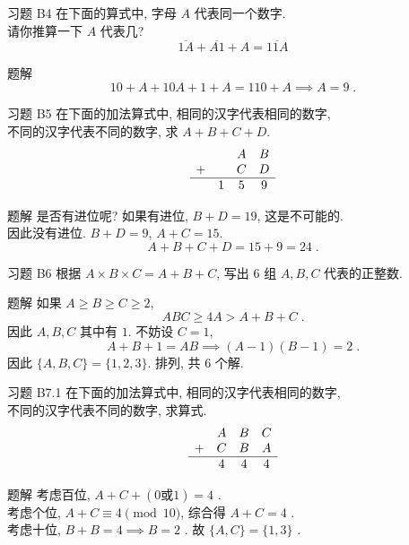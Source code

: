 \documentclass[content.tex]{subfiles}
\begin{document}
\begin{frame}{习题 B4}
在下面的算式中, 字母 $A$ 代表同一个数字. \\
请你推算一下 $A$ 代表几?
$$\overline{1A} + \overline{A1} + A = \overline{11A}$$
\begin{exampleblock}{题解}
$$10+A+10A+1+A=110+A\implies A = 9\;.$$
\end{exampleblock}
\end{frame}

\begin{frame}{习题 B5}
在下面的加法算式中, 相同的汉字代表相同的数字, \\ 不同的汉字代表不同的数字, 求 $A+B+C+D$.
$$
\begin{matrix}
  &   & A & B \\
+ &   & C & D \\
\hline
  & 1 & 5 & 9
\end{matrix}
$$
\begin{exampleblock}{题解}
是否有进位呢? 如果有进位, $B + D = 19$, 这是不可能的. \\
因此没有进位. $B + D = 9$, $A + C = 15$. 
$$A+B+C+D=15+9=24\;.$$
\end{exampleblock}
\end{frame}

\begin{frame}{习题 B6}
根据 $A\times B\times C = A+B+C$, 写出 6 组 $A, B, C$ 代表的正整数.
\begin{exampleblock}{题解}
如果 $A\ge B\ge C\ge 2$, 
$$ABC\ge 4A > A + B + C\;.$$
因此 $A,B,C$ 其中有 $1$. 不妨设 $C=1$, 
$$A+B+1=AB\implies (A-1)(B-1) = 2\;.$$
因此 $\{A, B, C\} = \{1, 2, 3\}$. 排列, 共 6 个解.
\end{exampleblock}
\end{frame}

\begin{frame}{习题 B7.1}
在下面的加法算式中, 相同的汉字代表相同的数字, \\ 不同的汉字代表不同的数字, 求算式.
$$
\begin{matrix}
  & A & B & C \\
+ & C & B & A \\
\hline
  & 4 & 4 & 4
\end{matrix}
$$
\begin{exampleblock}{题解}
考虑百位, $A+C+(0\text{或}1)=4$ . \\
考虑个位, $A+C\equiv 4 \pmod{10}$, 综合得 $A+C=4$ . \\
考虑十位, $B+B=4\implies B=2$ . 故 $\{A, C\}=\{1,3\}$ . \\
\end{exampleblock}
\end{frame}
\end{document}

